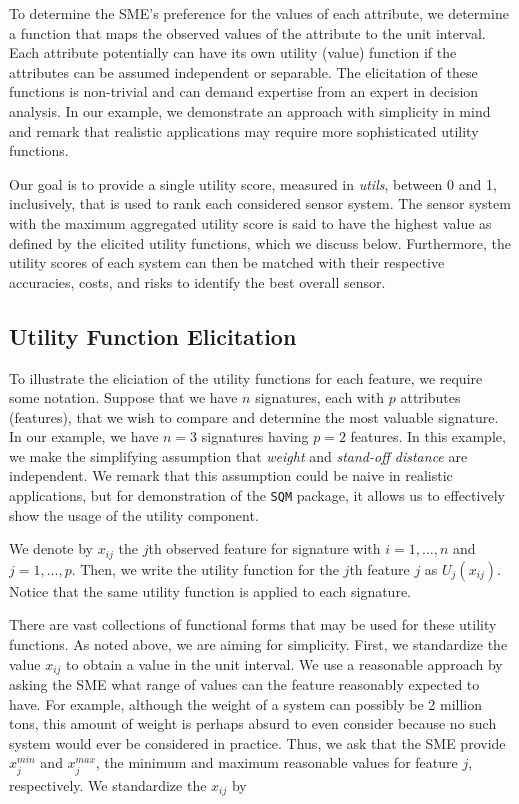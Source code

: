 \documentclass{article}
\begin{document}
To determine the SME's preference for the values of each attribute, we determine
a function that maps the observed values of the attribute to the unit interval.
Each attribute potentially can have its own utility (value) function if the
attributes can be assumed independent or separable. The elicitation of these
functions is non-trivial and can demand expertise from an expert in decision
analysis. In our example, we demonstrate an approach with simplicity in mind and
remark that realistic applications may require more sophisticated utility
functions.

Our goal is to provide a single utility score, measured in \emph{utils}, between
0 and 1, inclusively, that is used to rank each considered sensor system. The
sensor system with the maximum aggregated utility score is said to have the
highest value as defined by the elicited utility functions, which we discuss
below. Furthermore, the utility scores of each system can then be matched with
their respective accuracies, costs, and risks to identify the best overall
sensor.

\subsection{Utility Function Elicitation}

To illustrate the eliciation of the utility functions for each feature, 
we require some notation. Suppose that we have $n$ signatures, each with
$p$ attributes (features), that we wish to compare and determine the most
valuable signature. In our example, we have $n = 3$ signatures having $p = 2$
features. In this example, we make the simplifying assumption that \emph{weight}
and \emph{stand-off distance} are independent. We remark that this assumption
could be naive in realistic applications, but for demonstration of the {\tt SQM}
package, it allows us to effectively show the usage of the utility component.

We denote by $x_{ij}$ the $j$th observed feature for signature with
$i = 1, \ldots, n$ and $j = 1, \ldots, p$. Then, we write the utility function
for the $j$th feature $j$ as $U_j(x_{ij})$. Notice that the same utility function
is applied to each signature.

There are vast collections of functional forms that may be used for these utility
functions. As noted above, we are aiming for simplicity. First, we standardize
the value $x_{ij}$ to obtain a value in the unit interval. We use a reasonable
approach by asking the SME what range of values can the feature reasonably
expected to have. For example, although the weight of a system can possibly
be 2 million tons, this amount of weight is perhaps absurd to even consider
because no such system would ever be considered in practice. Thus, we ask that
the SME provide $x_j^{min}$ and $x_j^{max}$, the minimum and maximum reasonable
values for feature $j$, respectively. We standardize the $x_{ij}$ by
\end{document}
